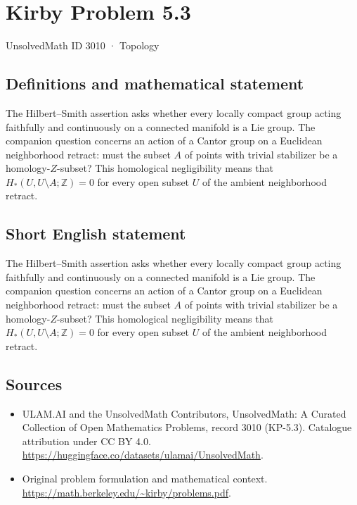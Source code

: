 \documentclass[11pt]{article}
\begin{document}
\setcounter{section}{3009}
\section{Kirby Problem 5.3}\label{3010}
{\small UnsolvedMath ID 3010 · Topology}
\subsection{Definitions and mathematical statement}
The Hilbert--Smith assertion asks whether every locally compact group acting faithfully and continuously on a connected manifold is a Lie group. The companion question concerns an action of a Cantor group on a Euclidean neighborhood retract: must the subset $A$ of points with trivial stabilizer be a homology-$Z$-subset? This homological negligibility means that $H_*(U,U\setminus A;\mathbb Z)=0$ for every open subset $U$ of the ambient neighborhood retract.
\subsection{Short English statement}
The Hilbert--Smith assertion asks whether every locally compact group acting faithfully and continuously on a connected manifold is a Lie group. The companion question concerns an action of a Cantor group on a Euclidean neighborhood retract: must the subset $A$ of points with trivial stabilizer be a homology-$Z$-subset? This homological negligibility means that $H_*(U,U\setminus A;\mathbb Z)=0$ for every open subset $U$ of the ambient neighborhood retract.
\subsection{Sources}
\begin{itemize}
\item[\hypertarget{source:3010:1}{S1}] ULAM.AI and the UnsolvedMath Contributors, UnsolvedMath: A Curated Collection of Open Mathematics Problems, record 3010 (KP-5.3). Catalogue attribution under CC BY 4.0.
\url{https://huggingface.co/datasets/ulamai/UnsolvedMath}.
\item[\hypertarget{source:3010:2}{S2}] Original problem formulation and mathematical context.
\url{https://math.berkeley.edu/~kirby/problems.pdf}.
\end{itemize}
\label{end:3010}
\end{document}
